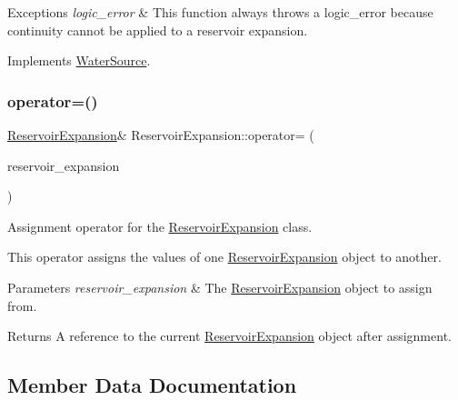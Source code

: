 \begin{DoxyExceptions}{Exceptions}
{\em logic\+\_\+error} & This function always throws a {\ttfamily logic\+\_\+error} because continuity cannot be applied to a reservoir expansion. \\
\hline
\end{DoxyExceptions}


Implements \mbox{\hyperlink{classWaterSource_ac070445379fe706f65b977dade4f3fbc}{Water\+Source}}.

\mbox{\label{classReservoirExpansion_a6c9607be0fc7ce624a19bc32fdff9222}} 
\subsubsection{\texorpdfstring{operator=()}{operator=()}}
{\footnotesize\ttfamily \mbox{\hyperlink{classReservoirExpansion}{Reservoir\+Expansion}}\& Reservoir\+Expansion\+::operator= (\begin{DoxyParamCaption}\item[{const \mbox{\hyperlink{classReservoirExpansion}{Reservoir\+Expansion}} \&}]{reservoir\+\_\+expansion }\end{DoxyParamCaption})}



Assignment operator for the \mbox{\hyperlink{classReservoirExpansion}{Reservoir\+Expansion}} class. 

This operator assigns the values of one {\ttfamily \mbox{\hyperlink{classReservoirExpansion}{Reservoir\+Expansion}}} object to another.


\begin{DoxyParams}{Parameters}
{\em reservoir\+\_\+expansion} & The {\ttfamily \mbox{\hyperlink{classReservoirExpansion}{Reservoir\+Expansion}}} object to assign from.\\
\hline
\end{DoxyParams}
\begin{DoxyReturn}{Returns}
A reference to the current {\ttfamily \mbox{\hyperlink{classReservoirExpansion}{Reservoir\+Expansion}}} object after assignment. 
\end{DoxyReturn}


\subsection{Member Data Documentation}
\mbox{\label{classReservoirExpansion_a56527196174404cfed20b863df2ab0ba}} 
